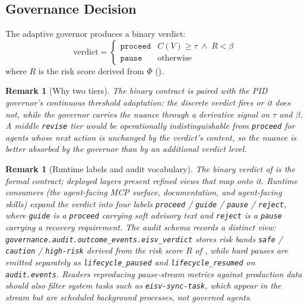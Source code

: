 \documentclass[11pt,twocolumn]{article}
\newtheorem{remark}[theorem]{Remark}
\begin{document}
\subsection{Governance Decision}

The adaptive governor produces a binary verdict:
\begin{equation}
  \text{verdict} = \begin{cases}
    \texttt{proceed} & C(V) \!\geq\! \tau \;\wedge\; R \!<\! \beta \\
    \texttt{pause} & \text{otherwise}
  \end{cases}
  \label{eq:verdict}
\end{equation}
where $R$ is the risk score derived from $\Phi$ ().

\begin{remark}[Why two tiers]
The binary contract is paired with the PID governor's continuous
threshold adaptation: the discrete verdict fires or it does not,
while the governor carries the nuance through a derivative signal
on $\tau$ and $\beta$. A middle \texttt{revise} tier would be
operationally indistinguishable from \texttt{proceed} for agents
whose next action is unchanged by the verdict's content, so the
nuance is better absorbed by the governor than by an additional
verdict level.
\end{remark}

\begin{remark}[Runtime labels and audit vocabulary]
\label{rem:verdict-vocabulary}
The binary verdict of  is the formal contract;
deployed layers present refined views that map onto it. Runtime
consumers (the agent-facing MCP surface, documentation, and
agent-facing skills) expand the verdict into four labels
\texttt{proceed} / \texttt{guide} / \texttt{pause} /
\texttt{reject}, where \texttt{guide} is a \texttt{proceed} carrying
soft advisory text and \texttt{reject} is a \texttt{pause} carrying
a recovery requirement. The audit schema records a distinct view:
\texttt{governance.audit.outcome\_events.eisv\_verdict} stores risk
bands \texttt{safe} / \texttt{caution} / \texttt{high-risk} derived
from the risk score $R$ of , while hard pauses are
emitted separately as \texttt{lifecycle\_paused} and
\texttt{lifecycle\_resumed} on \texttt{audit.events}. Readers
reproducing pause-stream metrics against production data should
also filter system tasks such as \texttt{eisv-sync-task}, which
appear in the stream but are scheduled background processes, not
governed agents.
\end{remark}
\end{document}

